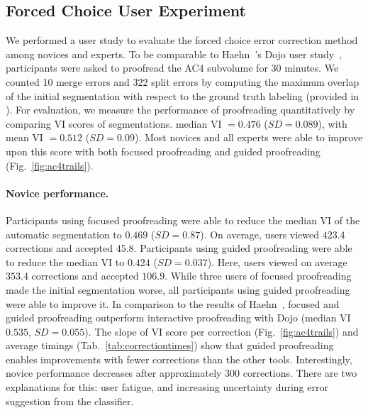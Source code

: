 \subsection{Forced Choice User Experiment}
We performed a user study to evaluate the forced choice error correction method among novices and experts. To be comparable to Haehn~\etal's Dojo user study~\cite{haehn_dojo_2014}, participants were asked to proofread the AC4 subvolume for 30 minutes. We counted 10 merge errors and 322 split errors by computing the maximum overlap of the initial segmentation with respect to the ground truth labeling (provided in \cite{haehn_dojo_2014}). For evaluation, we measure the performance of proofreading quantitatively by comparing VI scores of segmentations. 
 median VI $=0.476$ ($SD=0.089$), with mean VI $=0.512$ ($SD=0.09$). Most novices and all experts were able to improve upon this score with both focused proofreading and guided proofreading (Fig.~\ref{fig:ac4trails}).

\paragraph{Novice performance.} Participants using focused proofreading were able to reduce the median VI of the automatic segmentation to $0.469$ ($SD=0.87$). On average, users viewed $423.4$ corrections and accepted $45.8$.
Participants using guided proofreading were able to reduce the median VI to $0.424$ ($SD=0.037$). Here, users viewed on average $353.4$ corrections and accepted $106.9$.
While three users of focused proofreading made the initial segmentation worse, all participants using guided proofreading were able to improve it. In comparison to the results of Haehn~\etal, focused and guided proofreading outperform interactive proofreading with Dojo (median VI $0.535$, $SD=0.055$). The slope of VI score per correction (Fig.~\ref{fig:ac4trails}) and average timings (Tab.~\ref{tab:correctiontimes}) show that guided proofreading enables improvements with fewer corrections than the other tools. Interestingly, novice performance decreases after approximately $300$ corrections. There are two explanations for this: user fatigue, and increasing uncertainty during error suggestion from the classifier. %

